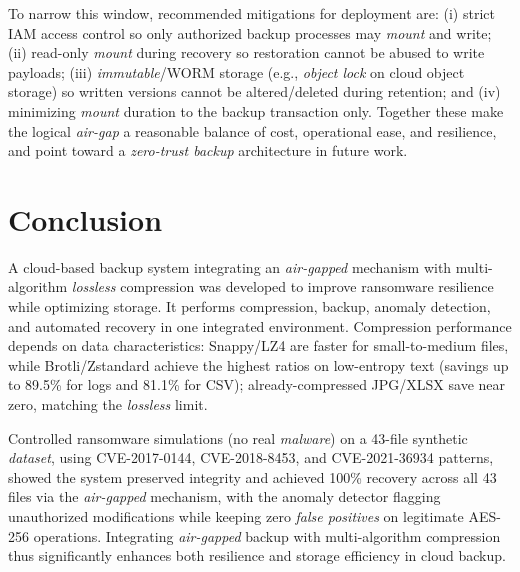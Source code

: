 \documentclass{iaesarticle}
\begin{document}
To narrow this window, recommended mitigations for deployment are: (i) strict IAM access control so only authorized backup processes may \textit{mount} and write; (ii) read-only \textit{mount} during recovery so restoration cannot be abused to write payloads; (iii) \textit{immutable}/WORM storage (e.g., \textit{object lock} on cloud object storage) so written versions cannot be altered/deleted during retention; and (iv) minimizing \textit{mount} duration to the backup transaction only. Together these make the logical \textit{air-gap} a reasonable balance of cost, operational ease, and resilience, and point toward a \textit{zero-trust backup} architecture in future work.

\section{Conclusion}
\label{sec:conclusion}
A cloud-based backup system integrating an \textit{air-gapped} mechanism with multi-algorithm \textit{lossless} compression was developed to improve ransomware resilience while optimizing storage. It performs compression, backup, anomaly detection, and automated recovery in one integrated environment. Compression performance depends on data characteristics: Snappy/LZ4 are faster for small-to-medium files, while Brotli/Zstandard achieve the highest ratios on low-entropy text (savings up to 89.5\% for logs and 81.1\% for CSV); already-compressed JPG/XLSX save near zero, matching the \textit{lossless} limit.

Controlled ransomware simulations (no real \textit{malware}) on a 43-file synthetic \textit{dataset}, using CVE-2017-0144, CVE-2018-8453, and CVE-2021-36934 patterns, showed the system preserved integrity and achieved 100\% recovery across all 43 files via the \textit{air-gapped} mechanism, with the anomaly detector flagging unauthorized modifications while keeping zero \textit{false positives} on legitimate AES-256 operations. Integrating \textit{air-gapped} backup with multi-algorithm compression thus significantly enhances both resilience and storage efficiency in cloud backup.
\end{document}
